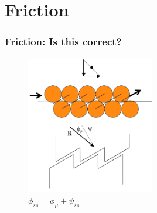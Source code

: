 \documentclass[notes]{beamer}
\begin{document}
\section{Friction}
\begin{frame}
\frametitle{Friction: Is this correct?}
\begin{figure}
	\includegraphics[width=0.5\textwidth]{figs/friction-sawblade.png}
	\caption*{$\phi_{ss} = \phi_\mu + \psi_{ss}$}
\end{figure}
\end{frame}
\end{document}
